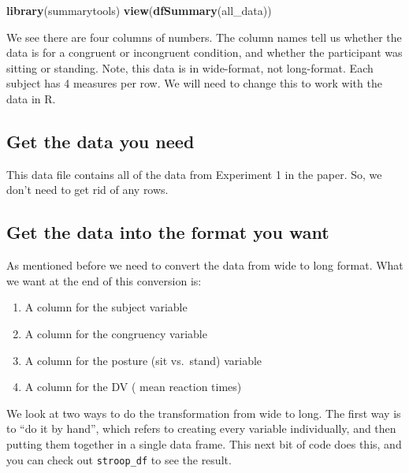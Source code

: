 \documentclass[]{book}
\newenvironment{Shaded}{\begin{snugshade}}{\end{snugshade}}
\newcommand{\KeywordTok}[1]{\textcolor[rgb]{0.13,0.29,0.53}{\textbf{{#1}}}}
\newcommand{\NormalTok}[1]{{#1}}
\providecommand{\tightlist}{%
  \setlength{\itemsep}{0pt}\setlength{\parskip}{0pt}}
\theoremstyle{definition}
\theoremstyle{definition}
\theoremstyle{definition}
\theoremstyle{remark}
\begin{document}
\begin{Shaded}
\begin{Highlighting}[]
\KeywordTok{library}\NormalTok{(summarytools)}
\KeywordTok{view}\NormalTok{(}\KeywordTok{dfSummary}\NormalTok{(all_data))}
\end{Highlighting}
\end{Shaded}

We see there are four columns of numbers. The column names tell us
whether the data is for a congruent or incongruent condition, and
whether the participant was sitting or standing. Note, this data is in
wide-format, not long-format. Each subject has 4 measures per row. We
will need to change this to work with the data in R.

\subsection{Get the data you need}\label{get-the-data-you-need-2}

This data file contains all of the data from Experiment 1 in the paper.
So, we don't need to get rid of any rows.

\subsection{Get the data into the format you
want}\label{get-the-data-into-the-format-you-want}

As mentioned before we need to convert the data from wide to long
format. What we want at the end of this conversion is:

\begin{enumerate}
\def\labelenumi{\arabic{enumi}.}
\tightlist
\item
  A column for the subject variable
\item
  A column for the congruency variable
\item
  A column for the posture (sit vs.~stand) variable
\item
  A column for the DV ( mean reaction times)
\end{enumerate}

We look at two ways to do the transformation from wide to long. The
first way is to ``do it by hand'', which refers to creating every
variable individually, and then putting them together in a single data
frame. This next bit of code does this, and you can check out
\texttt{stroop\_df} to see the result.
\end{document}
